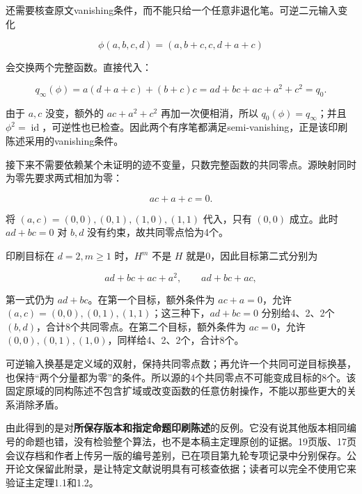 \documentclass[UTF8,fontset=fandol,zihao=-4,openany,oneside]{ctexbook}
\begin{document}
还需要核查原文vanishing条件，而不能只给一个任意非退化笔。可逆二元输入变化



\[
\phi(a,b,c,d)=(a,b+c,c,d+a+c)
\]



会交换两个完整函数。直接代入：



\[
q_\infty(\phi)=a(d+a+c)+(b+c)c
=ad+bc+ac+a^2+c^2=q_0.
\]



由于 \(a,c\) 没变，额外的 \(ac+a^2+c^2\) 再加一次便相消，所以 \(q_0(\phi)=q_\infty\)；并且 \(\phi^2=\operatorname{id}\)，可逆性也已检查。因此两个有序笔都满足semi-vanishing，正是该印刷陈述采用的vanishing条件。



接下来不需要依赖某个未证明的迹不变量，只数完整函数的共同零点。源映射同时为零先要求两式相加为零：



\[
ac+a+c=0.
\]



将 \((a,c)=(0,0),(0,1),(1,0),(1,1)\) 代入，只有 \((0,0)\) 成立。此时 \(ad+bc=0\) 对 \(b,d\) 没有约束，故共同零点恰为4个。



印刷目标在 \(d=2,m\ge1\) 时，\(H^m\) 不是 \(H\) 就是0，因此目标第二式分别为



\[
ad+bc+ac+a^2,
\qquad ad+bc+ac,
\]



第一式仍为 \(ad+bc\)。在第一个目标，额外条件为 \(ac+a=0\)，允许 \((a,c)=(0,0),(0,1),(1,1)\)；这三种下，\(ad+bc=0\) 分别给4、2、2个 \((b,d)\)，合计8个共同零点。在第二个目标，额外条件为 \(ac=0\)，允许 \((0,0),(0,1),(1,0)\)，同样给4、2、2个，合计8个。



可逆输入换基是定义域的双射，保持共同零点数；再允许一个共同可逆目标换基，也保持“两个分量都为零”的条件。所以源的4个共同零点不可能变成目标的8个。该固定原域的同构陈述不包含扩域或改变函数的任意仿射操作，不能以那些更大的关系消除矛盾。



由此得到的是对\textbf{所保存版本和指定命题印刷陈述}的反例。它没有说其他版本相同编号的命题也错，没有检验整个算法，也不是本稿主定理原创的证据。19页版、17页会议存档和作者上传另一版的编号差别，已在项目第九轮专项记录中分别保存。公开论文保留此附录，是让特定文献说明具有可核查依据；读者可以完全不使用它来验证主定理1.1和1.2。
\end{document}
